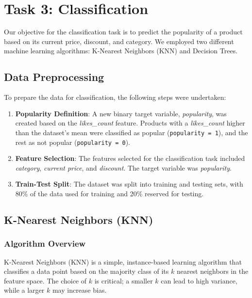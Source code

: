 \documentclass[a4paper,11pt]{article}
\begin{document}
\section{Task 3: Classification}

Our objective for the classification task is to predict the popularity of a product based on its current price, discount, and category. We employed two different machine learning algorithms: K-Nearest Neighbors (KNN) and Decision Trees.

\subsection{Data Preprocessing}

To prepare the data for classification, the following steps were undertaken:

\begin{enumerate}
    \item \textbf{Popularity Definition}: A new binary target variable, \textit{popularity}, was created based on the \textit{likes\_count} feature. Products with a \textit{likes\_count} higher than the dataset's mean were classified as popular (\texttt{popularity = 1}), and the rest as not popular (\texttt{popularity = 0}).
    \item \textbf{Feature Selection}: The features selected for the classification task included \textit{category}, \textit{current price}, and \textit{discount}. The target variable was \textit{popularity}.
    \item \textbf{Train-Test Split}: The dataset was split into training and testing sets, with 80\% of the data used for training and 20\% reserved for testing.
\end{enumerate}

\subsection{K-Nearest Neighbors (KNN)}

\subsubsection{Algorithm Overview}

K-Nearest Neighbors (KNN) is a simple, instance-based learning algorithm that classifies a data point based on the majority class of its \(k\) nearest neighbors in the feature space. The choice of \(k\) is critical; a smaller \(k\) can lead to high variance, while a larger \(k\) may increase bias.
\end{document}
